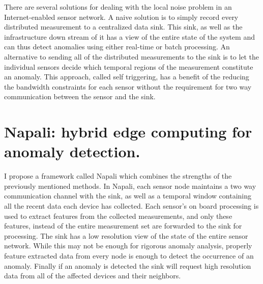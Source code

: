 There are several solutions for dealing with the local noise problem in an Internet-enabled sensor network. A naive solution is to simply record every distributed measurement to a centralized data sink. This sink, as well as the infrastructure down stream of it has a view of the entire state of the system and can thus detect anomalies using either real-time or batch processing. An alternative to sending all of the distributed measurements to the sink is to let the individual sensors decide which temporal regions of the measurement constitute an anomaly. This approach, called self triggering, has a benefit of the reducing the bandwidth constraints for each sensor without the requirement for two way communication between the sensor and the sink.

\section{Napali: hybrid edge computing for anomaly detection.} \label{intro:section:napali}
  
I propose a framework called Napali which combines the strengths of the previously mentioned methods. In Napali, each sensor node maintains a two way communication channel with the sink, as well as a temporal window containing all the recent data each device has collected. Each sensor's on board processing is used to extract features from the collected measurements, and only these features, instead of the entire measurement set are forwarded to the sink for processing. The sink has a low resolution view of the state of the entire sensor network. While this may not be enough for rigorous anomaly analysis, properly feature extracted data from every node is enough to detect the occurrence of an anomaly. Finally if an anomaly is detected the sink will request high resolution data from all of the affected devices and their neighbors. 

